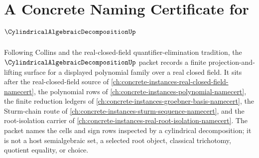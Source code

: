 \chapter{A Concrete Naming Certificate for $\CylindricalAlgebraicDecompositionUp$}
\label{ch:concrete-instances-cylindrical-algebraic-decomposition-namecert}

Following Collins and the real-closed-field quantifier-elimination tradition, the $\CylindricalAlgebraicDecompositionUp$ packet records a finite projection-and-lifting surface for a displayed polynomial family over a real closed field. It sits after the real-closed-field source of \autoref{ch:concrete-instances-real-closed-field-namecert}, the polynomial rows of \autoref{ch:concrete-instances-polynomial-namecert}, the finite reduction ledgers of \autoref{ch:concrete-instances-groebner-basis-namecert}, the Sturm-chain route of \autoref{ch:concrete-instances-sturm-sequence-namecert}, and the root-isolation carrier of \autoref{ch:concrete-instances-real-root-isolation-namecert}. The packet names the cells and sign rows inspected by a cylindrical decomposition; it is not a host semialgebraic set, a selected root object, classical trichotomy, quotient equality, or choice.

